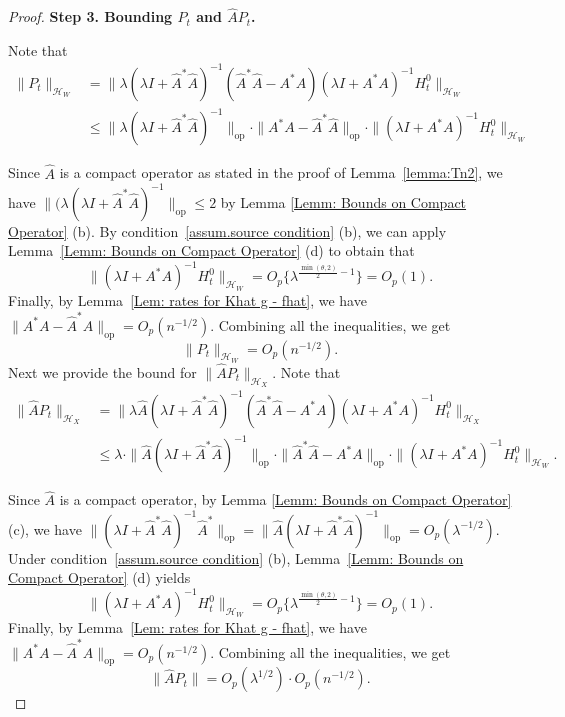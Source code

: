 \documentclass[
  12pt]{article}
\def\wh{\widehat}
\def\cH{\mathcal{H}}
\begin{document}
\begin{proof}
\noindent\textbf{Step 3. Bounding $P_t$ and $\widehat{A}P_t$.}

Note that
\begin{align*}\label{eq: bound for Xi4}
	\|P_t\|_{\mathcal{H}_W}&= \|\lambda (\lambda I+\widehat{A}^*\widehat{A})^{-1}(\widehat{A}^*\widehat{A}-A^*A ) (\lambda I+A^*A)^{-1}H^0_t\|_{\mathcal{H}_W}\\
	&\le \|\lambda (\lambda I+\widehat{A}^*\widehat{A})^{-1}\|_{\mathrm{op}}\cdot \|A^*A-\widehat{A}^*\widehat{A}\|_{\mathrm{op}}\cdot \|(\lambda I+A^*A)^{-1}H^0_t\|_{\mathcal{H}_W} 
\end{align*}

Since $\wh{A}$ is a compact operator as stated in the proof of Lemma~\ref{lemma:Tn2}, we have $\|(\lambda (\lambda I + \widehat{A}^*\widehat{A})^{-1}\|_{\mathrm{op}}\leq 
2$ by Lemma \ref{Lemm: Bounds on Compact Operator} (b). By condition~\ref{assum.source condition} (b), we can apply Lemma~\ref{Lemm: Bounds on Compact Operator} (d) to obtain that 
$$\|(\lambda I + A^*A)^{-1}H^0_t\|_{\mathcal{H}_W}=O_p\{\lambda^{\frac{\min(\theta ,2)}{2}-1}\}=O_p(1).
$$
Finally, by Lemma~\ref{Lem: rates for Khat g - fhat}, we have $ \|A^*A-\widehat{A}^*\widehat{A}\|_{\mathrm{op}}=O_p(n^{-1/2})$. Combining all the inequalities, we get
$$
\| P_t\|_{\mathcal{H}_W} =  O_p(n^{-1/2}).
$$
Next we provide the bound for $\| \widehat{A}P_t \|_{\cH_X}$. Note that
\begin{align*}
	\|\widehat{A}P_t\|_{\mathcal{H}_X} &=\|\lambda \widehat{A}(\lambda I+\widehat{A}^*\widehat{A})^{-1}(\widehat{A}^*\widehat{A}-A^*A )(\lambda I+A^*A)^{-1}H^0_t\|_{\mathcal{H}_X}\\
	&\le \lambda \cdot \|\widehat{A}(\lambda I+\widehat{A}^*\widehat{A})^{-1}\|_{\mathrm{op}}\cdot \|\widehat{A}^*\widehat{A}-A^*A\|_{\mathrm{op}}\cdot \|(\lambda I+A^*A)^{-1}H^0_t\|_{\mathcal{H}_W}.
\end{align*}

Since $\widehat{A}$ is a compact operator, by Lemma \ref{Lemm: Bounds on Compact Operator} (c), we have $\|(\lambda I + \widehat{A}^*\widehat{A} )^{-1}\widehat{A}^*\|_{\mathrm{op}}=\|\widehat{A}(\lambda I +\widehat{A}^*\widehat{A} )^{-1}\|_{\mathrm{op}}= O_p(\lambda^{-1/2})$. Under condition~\ref{assum.source condition} (b), Lemma~\ref{Lemm: Bounds on Compact Operator} (d) yields $$\|(\lambda I + A^*A)^{-1}H^0_t\|_{\mathcal{H}_W}=O_p\{ \lambda^{\frac{\min(\theta ,2)}{2}-1}\}=O_p(1).
$$
Finally, by Lemma~\ref{Lem: rates for Khat g - fhat}, we have $ \|A^*A-\widehat{A}^*\widehat{A}\|_{\mathrm{op}}=O_p(n^{-1/2})$. Combining all the inequalities, we get
$$
\| \widehat{A}P_t\| =  O_p(\lambda^{1/2})\cdot O_p(n^{-1/2}).
$$


\end{proof}
\end{document}
